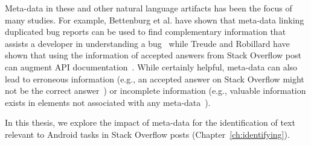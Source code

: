 Meta-data in these and other natural language artifacts has been 
the focus of many studies. For example, 
Bettenburg et al. have shown that meta-data linking duplicated bug reports 
can be used to find complementary 
information that assists a developer in understanding a bug~\cite{bettenburg2008}
while Treude and Robillard have shown that using the information of accepted 
answers from Stack Overflow post 
can augment API documentation~\cite{Treude2016}.
While certainly helpful, 
meta-data can also lead to erroneous information 
(e.g., an accepted answer on Stack Overflow 
might not be the correct answer~\cite{wang2018}) 
or incomplete information 
(e.g., valuable information exists in elements not associated with any meta-data~\cite{zhang2019so}).


In this thesis, we explore the impact of meta-data for the identification 
of text relevant to Android tasks in Stack Overflow posts (Chapter~\ref{ch:identifying}).





























